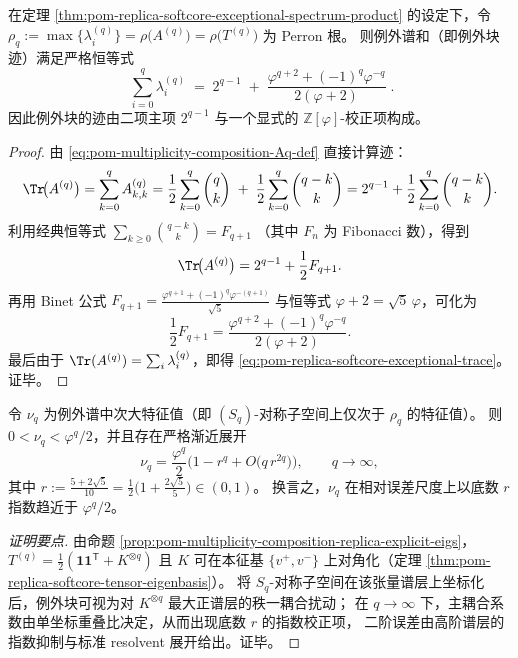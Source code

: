 \begin{theorem}\label{thm:pom-replica-softcore-exceptional-spectrum-trace}
在定理 \ref{thm:pom-replica-softcore-exceptional-spectrum-product} 的设定下，令
\(
\rho_q:=\max\{\lambda_i^{(q)}\}
=\rho\!\bigl(A^{(q)}\bigr)=\rho\!\bigl(T^{(q)}\bigr)
\)
为 Perron 根。
则例外谱和（即例外块迹）满足严格恒等式
\begin{equation}\label{eq:pom-replica-softcore-exceptional-trace}
\boxed{\;
\sum_{i=0}^{q}\lambda_i^{(q)}
\;=\;
2^{q-1}
\;+\;
\frac{\varphi^{q+2}+(-1)^q\varphi^{-q}}{2(\varphi+2)}\; } .
\end{equation}
因此例外块的迹由二项主项 \(2^{q-1}\) 与一个显式的 \(\mathbb Z[\varphi]\)-校正项构成。
\end{theorem}
\begin{proof}
由 \eqref{eq:pom-multiplicity-composition-Aq-def} 直接计算迹：
\[
\Tr\!\bigl(A^{(q)}\bigr)
=\sum_{k=0}^{q}A^{(q)}_{k,k}
=\frac12\sum_{k=0}^{q}\binom{q}{k}
\;+\;\frac12\sum_{k=0}^{q}\binom{q-k}{k}
=2^{q-1}+\frac12\sum_{k=0}^{q}\binom{q-k}{k}.
\]
利用经典恒等式
\(
\sum_{k\ge 0}\binom{q-k}{k}=F_{q+1}
\)
（其中 \(F_n\) 为 Fibonacci 数），得到
\[
\Tr\!\bigl(A^{(q)}\bigr)=2^{q-1}+\frac12F_{q+1}.
\]
再用 Binet 公式 \(F_{q+1}=\frac{\varphi^{q+1}+(-1)^q\varphi^{-(q+1)}}{\sqrt5}\)
与恒等式 \(\varphi+2=\sqrt5\,\varphi\)，可化为
\[
\frac12F_{q+1}
=\frac{\varphi^{q+2}+(-1)^q\varphi^{-q}}{2(\varphi+2)}.
\]
最后由于 \(\Tr(A^{(q)})=\sum_i\lambda_i^{(q)}\)，即得 \eqref{eq:pom-replica-softcore-exceptional-trace}。证毕。
\end{proof}



\begin{theorem}\label{thm:pom-replica-softcore-second-exceptional-eigenvalue-asymptotics}
令 \(\nu_q\) 为例外谱中次大特征值（即 \((S_q)\)-对称子空间上仅次于 \(\rho_q\) 的特征值）。
则 \(0<\nu_q<\varphi^q/2\)，并且存在严格渐近展开
\begin{equation}\label{eq:pom-replica-softcore-nuq-asymptotics}
\nu_q
=\frac{\varphi^{q}}{2}\Bigg(1-r^{q}
+O\!\bigl(q\,r^{2q}\bigr)\Bigg),
\qquad q\to\infty,
\end{equation}
其中
\(
r:=\frac{5+2\sqrt5}{10}
=\frac12\bigl(1+\frac{2\sqrt5}{5}\bigr)\in(0,1)
\)。
换言之，\(\nu_q\) 在相对误差尺度上以底数 \(r\) 指数趋近于 \(\varphi^q/2\)。
\end{theorem}
\begin{proof}[证明要点]
由命题 \ref{prop:pom-multiplicity-composition-replica-explicit-eigs}，
\(
T^{(q)}=\frac12(\mathbf{1}\mathbf{1}^{\mathsf T}+K^{\otimes q})
\)
且 \(K\) 可在本征基 \(\{v^+,v^-\}\) 上对角化（定理 \ref{thm:pom-replica-softcore-tensor-eigenbasis}）。
将 \(S_q\)-对称子空间在该张量谱层上坐标化后，例外块可视为对 \(K^{\otimes q}\) 最大正谱层的秩一耦合扰动；
在 \(q\to\infty\) 下，主耦合系数由单坐标重叠比决定，从而出现底数 \(r\) 的指数校正项，
二阶误差由高阶谱层的指数抑制与标准 resolvent 展开给出。证毕。
\end{proof}

